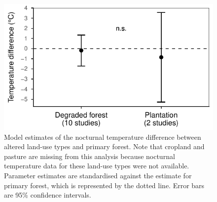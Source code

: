 \documentclass[12pt,a4paper,]{report}
\theoremstyle{definition}
\theoremstyle{definition}
\theoremstyle{definition}
\theoremstyle{remark}
\begin{document}
\begin{figure}[H]

{\centering \includegraphics{./output/fig-A-4-1} 

}

\caption{Model estimates of the nocturnal temperature difference
between altered land-use types and primary forest. Note that cropland
and pasture are missing from this analysis because nocturnal temperature
data for these land-use types were not available. Parameter estimates
are standardised against the estimate for primary forest, which is
represented by the dotted line. Error bars are 95\% confidence
intervals.}\label{fig:fig-A-4}
\end{figure}
\end{document}
